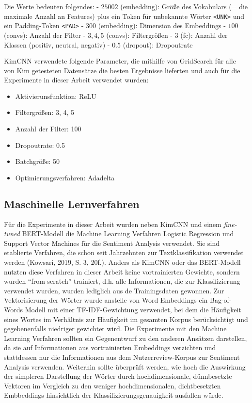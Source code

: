 \documentclass[11pt]{article}
\providecommand{\tightlist}{%
      \setlength{\itemsep}{0pt}\setlength{\parskip}{0pt}}
\begin{document}
Die Werte bedeuten folgendes: - \(25002\) (embedding): Größe des
Vokabulars (= die maximale Anzahl an Features) plus ein Token für
unbekannte Wörter \texttt{\textless{}UNK\textgreater{}} und ein
Padding-Token \texttt{\textless{}PAD\textgreater{}} - \(300\)
(embedding): Dimension des Embeddings - \(100\) (convs): Anzahl der
Filter - \(3, 4, 5\) (convs): Filtergrößen - \(3\) (fc): Anzahl der
Klassen (positiv, neutral, negativ) - \(0.5\) (dropout): Dropoutrate

KimCNN verwendete folgende Parameter, die mithilfe von GridSearch für
alle von Kim getesteten Datensätze die besten Ergebnisse lieferten und
auch für die Experimente in dieser Arbeit verwendet wurden:

\begin{itemize}
\tightlist
\item
  Aktivierunsfunktion: ReLU
\item
  Filtergrößen: 3, 4, 5
\item
  Anzahl der Filter: 100
\item
  Dropoutrate: 0.5
\item
  Batchgröße: 50
\item
  Optimierungsverfahren: Adadelta
\end{itemize}

    \hypertarget{maschinelle-lernverfahren}{%
\subsection{Maschinelle Lernverfahren}\label{maschinelle-lernverfahren}}

Für die Experimente in dieser Arbeit wurden neben KimCNN und einem
\emph{fine-tuned} BERT-Modell die Machine Learning Verfahren Logistic
Regression und Support Vector Machines für die Sentiment Analysis
verwendet. Sie sind etablierte Verfahren, die schon seit Jahrzehnten zur
Textklassifikation verwendet werden (Kowsari, 2019, S. 3, 20f.). Anders
als KimCNN oder das BERT-Modell nutzten diese Verfahren in dieser Arbeit
keine vortrainierten Gewichte, sondern wurden ``from scratch''
trainiert, d.h. alle Informationen, die zur Klassifizierung verwendet
wurden, wurden lediglich aus de Trainingsdaten gewonnen. Zur
Vektorisierung der Wörter wurde anstelle von Word Embeddings ein
Bag-of-Words Modell mit einer TF-IDF-Gewichtung verwendet, bei dem die
Häufigkeit eines Wortes im Verhältnis zur Häufigkeit im gesamten Korpus
berücksichtigt und gegebenenfalls niedriger gewichtet wird. Die
Experimente mit den Machine Learning Verfahren sollten ein Gegenentwurf
zu den anderen Ansätzen darstellen, da sie auf Informationen aus
vortrainierten Embeddings verzichten und stattdessen nur die
Informationen aus dem Nutzerreview-Korpus zur Sentiment Analysis
verwenden. Weiterhin sollte überprüft werden, wie hoch die Auswirkung
der simpleren Darstellung der Wörter durch hochdimensionale,
dünnbesetzte Vektoren im Vergleich zu den weniger hochdimensionalen,
dichtbesetzten Embbeddings hinsichtlich der Klassifizierungsgenauigkeit
ausfallen würde.
\end{document}
